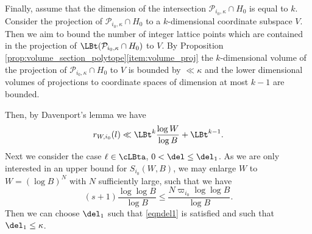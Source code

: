 Finally, assume that the dimension of the intersection $\mathcal{P}_{i_0,\kappa}\cap H_0$ is equal to $k$. Consider the projection of $\mathcal{P}_{i_0,\kappa}\cap H_0$ to a $k$-dimensional coordinate subspace $V$. Then we aim to bound the number of integer lattice points which are contained in the projection of $\LBt(\mathcal{P}_{i_0,\kappa}\cap H_0)$ to $V$. By Proposition \ref{prop:volume_section_polytope}\eqref{item:volume_proj} the $k$-dimensional volume of the projection of $\mathcal{P}_{i_0,\kappa}\cap H_0$ to $V$ is bounded by $\ll \kappa$ and the lower dimensional volumes of projections to coordinate spaces of dimension at most $k-1$ are bounded.

Then, by Davenport's lemma \cite{davenport} we have
\[
r_{W,i_0}(l)\ll \LBt^{k} \frac{\log W}{\log B} + \LBt^{k-1}.
\]
Next we consider the case $\ell\in\cLBta$, \ie $0<\del\leq \del_1$. As we are only interested in an upper bound for $S_{i_0}(W,B)$, we may enlarge $W$ to $W=(\log B)^N$ with $N$ sufficiently large, such that we have
\[
(s+1)\frac{\log\log B}{\log B} \leq \frac{ N \varpi_{i_0} \log \log B}{\log B}.
\]
Then we can choose $\del_1$ such that \eqref{eqndel1} is satisfied and such that $\del_1\leq \kappa$.

